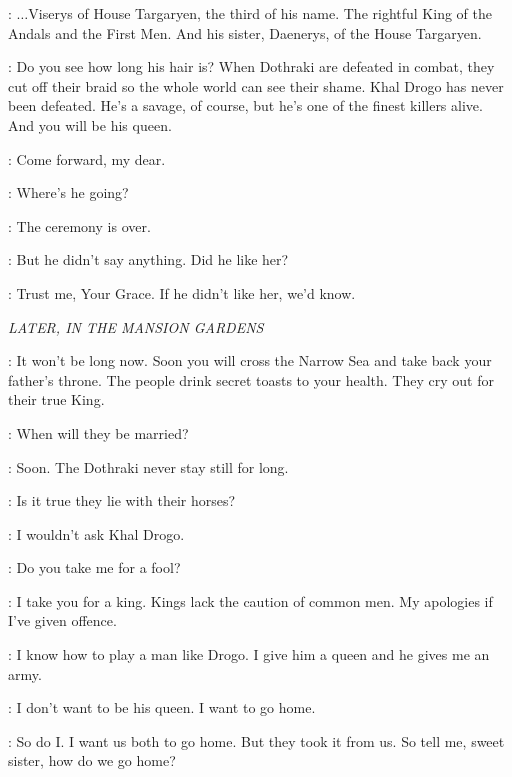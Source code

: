 \ILLYRIO: $\ldots$Viserys of House Targaryen, the third of his name. The rightful King of the Andals and the First Men. And his sister, Daenerys, of the House Targaryen. 

\VISERYS: Do you see how long his hair is? When Dothraki are defeated in combat, they cut off their braid so the whole world can see their shame. Khal Drogo has never been defeated. He's a savage, of course, but he's one of the finest killers alive. And you will be his queen. 

\ILLYRIO: Come forward, my dear. 


\VISERYS: Where's he going? 

\ILLYRIO: The ceremony is over. 

\VISERYS: But he didn't say anything. Did he like her? 

\ILLYRIO: Trust me, Your Grace. If he didn't like her, we'd know. 


\scene

\textit{LATER, IN THE MANSION GARDENS} 


\ILLYRIO: It won't be long now. Soon you will cross the Narrow Sea and take back your father's throne. The people drink secret toasts to your health. They cry out for their true King. 

\VISERYS: When will they be married? 

\ILLYRIO: Soon. The Dothraki never stay still for long. 

\VISERYS: Is it true they lie with their horses? 

\ILLYRIO: I wouldn't ask Khal Drogo. 

\VISERYS: Do you take me for a fool? 

\ILLYRIO: I take you for a king. Kings lack the caution of common men. My apologies if I've given offence. 

\VISERYS: I know how to play a man like Drogo. I give him a queen and he gives me an army. 

\DAENERYS: I don't want to be his queen. I want to go home. 

\VISERYS: So do I. I want us both to go home. But they took it from us. So tell me, sweet sister, how do we go home? 

